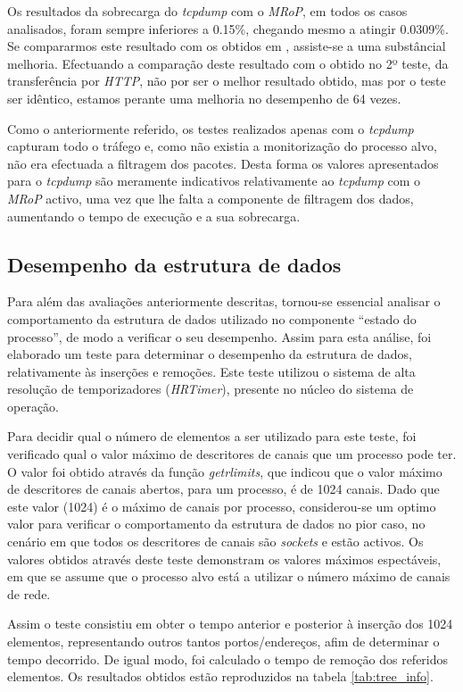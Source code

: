 Os resultados da sobrecarga do \textit{tcpdump} com o \textit{MRoP}, em todos os casos analisados, foram sempre inferiores a 0.15\%, chegando mesmo a atingir 0.0309\%.
Se compararmos este resultado com os obtidos em \cite{Farruca:2009}, assiste-se a uma substâncial melhoria.
Efectuando a comparação deste resultado com o obtido no 2º teste, da transferência por \textit{HTTP}, não por ser o melhor resultado obtido, mas por o teste ser idêntico, estamos perante uma melhoria no desempenho de 64 vezes.

Como o anteriormente referido, os testes realizados apenas com o \textit{tcpdump} capturam todo o tráfego e, como não existia a monitorização do processo alvo, não era efectuada a filtragem dos pacotes.
Desta forma os valores apresentados para o \textit{tcpdump} são meramente indicativos relativamente ao \textit{tcpdump} com o \textit{MRoP} activo, uma vez que lhe falta a componente de filtragem dos dados, aumentando o tempo de execução e a sua sobrecarga.

\subsection{Desempenho da estrutura de dados}

Para além das avaliações anteriormente descritas, tornou-se essencial analisar o comportamento da estrutura de dados utilizado no componente “estado do processo”, de modo a verificar o seu desempenho.
Assim para esta análise, foi elaborado um teste para determinar o desempenho da estrutura de dados, relativamente às inserções e remoções.
Este teste utilizou o sistema de alta resolução de temporizadores (\textit{HRTimer})\cite{hrtimerKernel}, presente no núcleo do sistema de operação.

Para decidir qual o número de elementos a ser utilizado para este teste, foi verificado qual o valor máximo de descritores de canais que um processo pode ter.
O valor foi obtido através da função \textit{getrlimits}, que indicou que o valor máximo de descritores de canais abertos, para um processo, é de 1024 canais.
Dado que este valor (1024) é o máximo de canais por processo, considerou-se um optimo valor para verificar o comportamento da estrutura de dados no pior caso, no cenário em que todos os descritores de canais são \textit{sockets} e estão activos.
Os valores obtidos através deste teste demonstram os valores máximos espectáveis, em que se assume que o processo alvo está a utilizar o número máximo de canais de rede.

Assim o teste consistiu em obter o tempo anterior e posterior à inserção dos 1024 elementos, representando outros tantos portos/endereços, afim de determinar o tempo decorrido.
De igual modo, foi calculado o tempo de remoção dos referidos elementos.
Os resultados obtidos estão reproduzidos na tabela \ref{tab:tree_info}.
 
